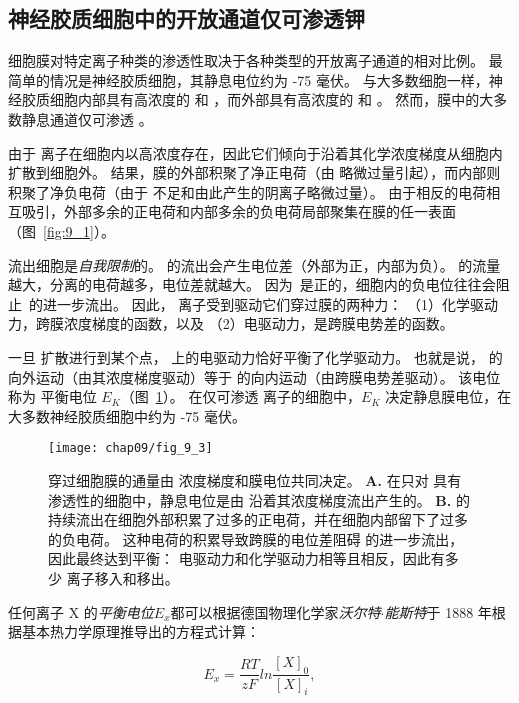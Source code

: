 \subsection{神经胶质细胞中的开放通道仅可渗透钾}

细胞膜对特定离子种类的渗透性取决于各种类型的开放离子通道的相对比例。
最简单的情况是神经胶质细胞，其静息电位约为 -75 毫伏。
与大多数细胞一样，神经胶质细胞内部具有高浓度的  和 ，而外部具有高浓度的  和 。
然而，膜中的大多数静息通道仅可渗透 。


由于  离子在细胞内以高浓度存在，因此它们倾向于沿着其化学浓度梯度从细胞内扩散到细胞外。
结果，膜的外部积聚了净正电荷（由  略微过量引起），而内部则积聚了净负电荷（由于  不足和由此产生的阴离子略微过量）。
由于相反的电荷相互吸引，外部多余的正电荷和内部多余的负电荷局部聚集在膜的任一表面（图~\ref{fig:9_1}）。


 流出细胞是\textit{自我限制}的。
 的流出会产生电位差（外部为正，内部为负）。
 的流量越大，分离的电荷越多，电位差就越大。
因为~是正的，细胞内的负电位往往会阻止~的进一步流出。
因此， 离子受到驱动它们穿过膜的两种力：
（1）化学驱动力，跨膜浓度梯度的函数，以及
（2）电驱动力，是跨膜电势差的函数。


一旦  扩散进行到某个点， 上的电驱动力恰好平衡了化学驱动力。
也就是说， 的向外运动（由其浓度梯度驱动）等于  的向内运动（由跨膜电势差驱动）。
该电位称为  平衡电位 $E_K$（图~\ref{fig:9_3}）。
在仅可渗透  离子的细胞中，$E_K$ 决定静息膜电位，在大多数神经胶质细胞中约为 -75 毫伏。


\begin{figure}[htbp]
	\centering
	\texttt{[image: chap09/fig\_9\_3]}
	\caption{ 穿过细胞膜的通量由  浓度梯度和膜电位共同决定。
		\textbf{A.} 在只对  具有渗透性的细胞中，静息电位是由  沿着其浓度梯度流出产生的。
		\textbf{B.}  的持续流出在细胞外部积累了过多的正电荷，并在细胞内部留下了过多的负电荷。
		这种电荷的积累导致跨膜的电位差阻碍  的进一步流出，因此最终达到平衡：
		电驱动力和化学驱动力相等且相反，因此有多少  离子移入和移出。}
	\label{fig:9_3}
\end{figure}


任何离子 X 的\textit{平衡电位}$E_x$都可以根据德国物理化学家\textit{沃尔特$\cdot$能斯特}于 1888 年根据基本热力学原理推导出的方程式计算：

\begin{equation}\label{eq:9_Nernst_Equation}
	E_x = \frac{RT}{zF} ln \frac{[X]_0}{[X]_i},
\end{equation}

